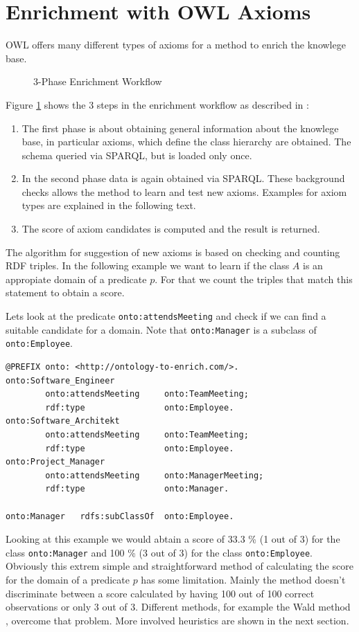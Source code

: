 \section{Enrichment with OWL Axioms}
OWL offers many different types of axioms for a method to enrich the knowlege
base. 
\begin{figure}
\label{3-Phase}
\centering
{}
\caption{3-Phase Enrichment Workflow\cite{paper2}}
\end{figure}
Figure \ref{3-Phase} shows the 3 steps in the enrichment workflow as described
in \cite{paper2}:
\begin{enumerate}
  \item The first phase is about obtaining general information about the
  knowlege base, in particular axioms, which define the class hierarchy are
  obtained. The schema queried via SPARQL, but is loaded only once.
  \item In the second phase data is again obtained via SPARQL. These background
  checks allows the method to learn and test new axioms. Examples for axiom
  types are explained in the following text.
  \item The score of axiom candidates is computed and the result is returned.
\end{enumerate}

The algorithm for suggestion of new axioms is based on checking and counting RDF
triples. In the following example we want to learn if the class $A$ is an
appropiate domain of a predicate $p$. For that we count the triples that match
this statement to obtain a score. 

\begin{example}
Lets look at the predicate \texttt{onto:attendsMeeting} and check if we can find
a suitable candidate for a domain. Note that \texttt{onto:Manager} is a subclass
of \texttt{onto:Employee}.
\end{example}
\begin{lstlisting}[morekeywords={onto, rdf, rdfs}, caption=Triples written in
turtle syntax] @PREFIX onto: <http://ontology-to-enrich.com/>.
onto:Software_Engineer		
		onto:attendsMeeting 	onto:TeamMeeting;
		rdf:type				onto:Employee.
onto:Software_Architekt		
		onto:attendsMeeting 	onto:TeamMeeting;
		rdf:type				onto:Employee.
onto:Project_Manager		
		onto:attendsMeeting 	onto:ManagerMeeting;
		rdf:type				onto:Manager.
		
onto:Manager   rdfs:subClassOf	onto:Employee.
\end{lstlisting}
Looking at this example we would abtain a score of 33.3 \% (1 out of 3) for the
class \texttt{onto:Manager} and 100 \% (3 out of 3) for the class
\texttt{onto:Employee}.\\
Obviously this extrem simple and straightforward method of calculating the score
for the domain of a predicate $p$ has some limitation.
Mainly the method doesn't discriminate between a score calculated by having 100
out of 100 correct observations or only 3 out of 3. Different methods, for
example the Wald method \cite{wald-methods}, overcome that problem. 
More involved heuristics are shown in the next section. 

